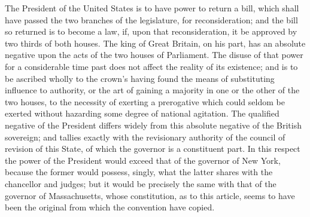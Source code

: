 The President of the United States is to have power to return a bill, which shall have passed the two branches of the legislature, for reconsideration; and the bill so returned is to become a law, if, upon that reconsideration, it be approved by two thirds of both houses. 
The king of Great Britain, on his part, has an absolute negative upon the acts of the two houses of Parliament. 
The disuse of that power for a considerable time past does not affect the reality of its existence; and is to be ascribed wholly to the crown's having found the means of substituting influence to authority, or the art of gaining a majority in one or the other of the two houses, to the necessity of exerting a prerogative which could seldom be exerted without hazarding some degree of national agitation. 
The qualified negative of the President differs widely from this absolute negative of the British sovereign; and tallies exactly with the revisionary authority of the council of revision of this State, of which the governor is a constituent part. 
In this respect the power of the President would exceed that of the governor of New York, because the former would possess, singly, what the latter shares with the chancellor and judges; but it would be precisely the same with that of the governor of Massachusetts, whose constitution, as to this article, seems to have been the original from which the convention have copied.

